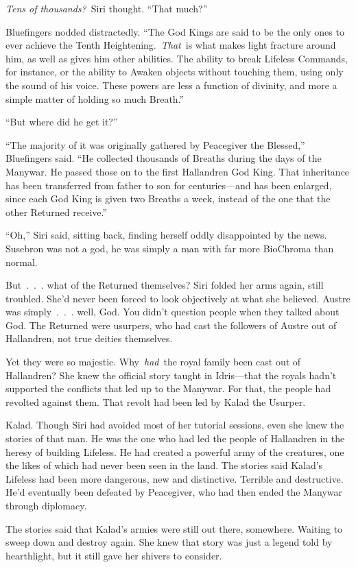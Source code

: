 \textit{Tens of thousands?}~Siri thought. “That much?”

Bluefingers nodded distractedly. “The God Kings are said to be the only ones to ever achieve the Tenth Heightening.~\textit{That}~is what makes light fracture around him, as well as gives him other abilities. The ability to break Lifeless Commands, for instance, or the ability to Awaken objects without touching them, using only the sound of his voice. These powers are less a function of divinity, and more a simple matter of holding so much Breath.”

“But where did he get it?”

“The majority of it was originally gathered by Peacegiver the Blessed,” Bluefingers said. “He collected thousands of Breaths during the days of the Manywar. He passed those on to the first Hallandren God King. That inheritance has been transferred from father to son for centuries—and has been enlarged, since each God King is given two Breaths a week, instead of the one that the other Returned receive.”

“Oh,” Siri said, sitting back, finding herself oddly disappointed by the news. Susebron was not a god, he was simply a man with far more BioChroma than normal.

But~.~.~. what of the Returned themselves? Siri folded her arms again, still troubled. She’d never been forced to look objectively at what she believed. Austre was simply~.~.~. well, God. You didn’t question people when they talked about God. The Returned were usurpers, who had cast the followers of Austre out of Hallandren, not true deities themselves.

Yet they were so majestic. Why~\textit{had}~the royal family been cast out of Hallandren? She knew the official story taught in Idris—that the royals hadn’t supported the conflicts that led up to the Manywar. For that, the people had revolted against them. That revolt had been led by Kalad the Usurper.

Kalad. Though Siri had avoided most of her tutorial sessions, even she knew the stories of that man. He was the one who had led the people of Hallandren in the heresy of building Lifeless. He had created a powerful army of the creatures, one the likes of which had never been seen in the land. The stories said Kalad’s Lifeless had been more dangerous, new and distinctive. Terrible and destructive. He’d eventually been defeated by Peacegiver, who had then ended the Manywar through diplomacy.

The stories said that Kalad’s armies were still out there, somewhere. Waiting to sweep down and destroy again. She knew that story was just a legend told by hearthlight, but it still gave her shivers to consider.

